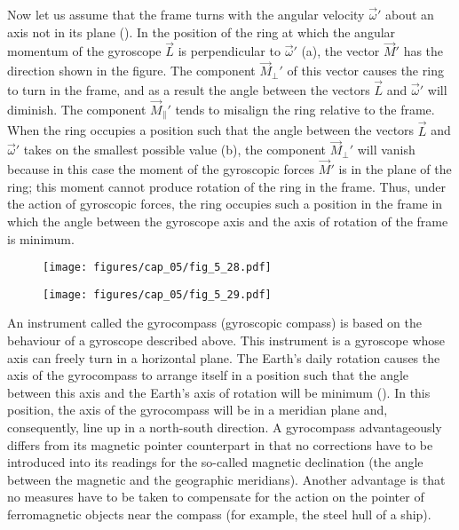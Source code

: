 Now let us assume that the frame turns with the angular velocity $\vec{\omega}'$ about an axis not in its plane (). In the position of the ring at which the angular momentum of the gyroscope $\vec{L}$ is perpendicular to $\vec{\omega}'$ (a), the vector $\vec{M}'$ has the direction shown in the figure. The component $\vec{M}_{\perp}'$ of this vector causes the ring to turn in the frame, and as a result the angle between the vectors $\vec{L}$ and $\vec{\omega}'$ will diminish. The component $\vec{M}_{\parallel}'$ tends to misalign the ring relative to the frame. When the ring occupies a position such that the angle between the vectors $\vec{L}$ and $\vec{\omega}'$ takes on the smallest possible value (b), the component $\vec{M}_{\perp}'$ will vanish because in this case the moment of the gyroscopic forces $\vec{M}'$ is in the plane of the ring; this moment cannot produce rotation of the ring in the frame. Thus, under the action of gyroscopic forces, the ring occupies such a position in the frame in which the angle between the gyroscope axis and the axis of rotation of the frame is minimum.

\begin{figure}[t]
	\begin{minipage}[t]{0.4\linewidth}
		\begin{center}
			\texttt{[image: figures/cap\_05/fig\_5\_28.pdf]}
			\caption[]{}
			\label{fig:5_28}
		\end{center}
	\end{minipage}
	\hspace{-0.05cm}
	\begin{minipage}[t]{0.6\linewidth}
		\begin{center}
			\texttt{[image: figures/cap\_05/fig\_5\_29.pdf]}
			\caption[]{}
			\label{fig:5_29}
		\end{center}
	\end{minipage}
	\vspace{-0.7cm}
\end{figure}

An instrument called the gyrocompass (gyroscopic compass) is based on the behaviour of a gyroscope described above. This instrument is a gyroscope whose axis can freely turn in a horizontal plane. The Earth's daily rotation causes the axis of the gyrocompass to arrange itself in a position such that the angle between this axis and the Earth's axis of rotation will be minimum (). In this position, the axis of the gyrocompass will be in a meridian plane and, consequently, line up in a north-south direction. A gyrocompass advantageously differs from its magnetic pointer counterpart in that no corrections have to be introduced into its readings for the so-called magnetic declination (the angle between the magnetic and the geographic meridians). Another advantage is that no measures have to be taken to compensate for the action on the pointer of ferromagnetic objects near the compass (for example, the steel hull of a ship).


